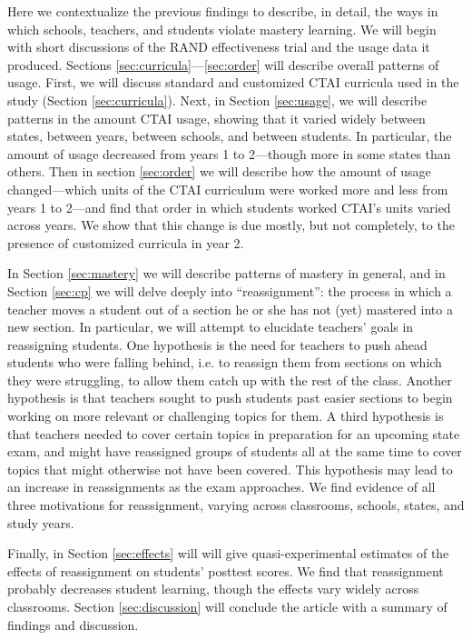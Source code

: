\documentclass[notitlepage,12pt]{jedm}\usepackage[]{graphicx}\usepackage[]{color}
\begin{document}
Here we contextualize the previous findings to describe, in detail, the ways
in which schools, teachers, and students violate mastery learning.
We will begin with short discussions of the RAND effectiveness trial and the usage
data it produced.
Sections \ref{sec:curricula}---\ref{sec:order} will describe overall
patterns of usage.
First, we will discuss standard and customized CTAI curricula used in
the study (Section \ref{sec:curricula}).
Next, in Section \ref{sec:usage}, we will describe patterns in the amount CTAI usage, showing that
it varied widely between states, between years, between schools, and between students.
In particular, the amount of usage decreased from years 1 to
2---though more in some states than others.
Then in section \ref{sec:order} we will describe how the amount of usage
changed---which units of the CTAI curriculum were worked more and less
from years 1 to 2---and find that order in which students worked
CTAI's units varied across years. We show that this change is due
mostly, but not completely, to the presence of customized curricula in
year 2.

In Section \ref{sec:mastery} we will describe patterns of mastery in general,
and in Section \ref{sec:cp} we will delve deeply into ``reassignment'': the process in which a
teacher moves a student out of a section he or she has not (yet)
mastered into a new section.
In particular, we will attempt to elucidate teachers' goals in
reassigning students. One hypothesis is the need for teachers to push
ahead students who were falling behind, i.e. to reassign them from
sections on which they were struggling, to allow them catch up with
the rest of the class. Another hypothesis is that teachers sought to
push students past easier sections to begin working on more relevant
or challenging topics for them. A third hypothesis is that teachers needed to cover certain topics in preparation for an upcoming state exam, and might have reassigned groups of students all at the same time to cover topics that might otherwise not have been covered. This hypothesis may lead to an increase in reassignments as the exam approaches.
We find evidence of all three motivations for reassignment, varying
across classrooms, schools, states, and study  years.

Finally, in Section \ref{sec:effects} will will give
quasi-experimental estimates of the effects of reassignment on
students' posttest scores.
We find that reassignment probably decreases student learning,
though the effects vary widely across classrooms.
Section \ref{sec:discussion} will conclude the article with a summary
of findings and discussion.
\end{document}
